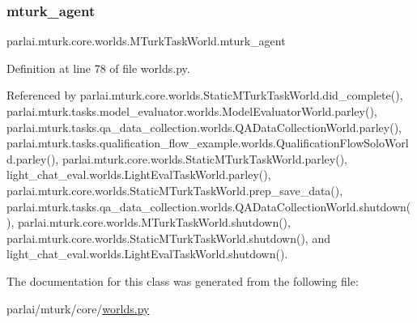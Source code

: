 \subsubsection{\texorpdfstring{mturk\+\_\+agent}{mturk\_agent}}
{\footnotesize\ttfamily parlai.\+mturk.\+core.\+worlds.\+M\+Turk\+Task\+World.\+mturk\+\_\+agent}



Definition at line 78 of file worlds.\+py.



Referenced by parlai.\+mturk.\+core.\+worlds.\+Static\+M\+Turk\+Task\+World.\+did\+\_\+complete(), parlai.\+mturk.\+tasks.\+model\+\_\+evaluator.\+worlds.\+Model\+Evaluator\+World.\+parley(), parlai.\+mturk.\+tasks.\+qa\+\_\+data\+\_\+collection.\+worlds.\+Q\+A\+Data\+Collection\+World.\+parley(), parlai.\+mturk.\+tasks.\+qualification\+\_\+flow\+\_\+example.\+worlds.\+Qualification\+Flow\+Solo\+World.\+parley(), parlai.\+mturk.\+core.\+worlds.\+Static\+M\+Turk\+Task\+World.\+parley(), light\+\_\+chat\+\_\+eval.\+worlds.\+Light\+Eval\+Task\+World.\+parley(), parlai.\+mturk.\+core.\+worlds.\+Static\+M\+Turk\+Task\+World.\+prep\+\_\+save\+\_\+data(), parlai.\+mturk.\+tasks.\+qa\+\_\+data\+\_\+collection.\+worlds.\+Q\+A\+Data\+Collection\+World.\+shutdown(), parlai.\+mturk.\+core.\+worlds.\+M\+Turk\+Task\+World.\+shutdown(), parlai.\+mturk.\+core.\+worlds.\+Static\+M\+Turk\+Task\+World.\+shutdown(), and light\+\_\+chat\+\_\+eval.\+worlds.\+Light\+Eval\+Task\+World.\+shutdown().



The documentation for this class was generated from the following file\+:\begin{DoxyCompactItemize}
\item 
parlai/mturk/core/\hyperlink{parlai_2mturk_2core_2worlds_8py}{worlds.\+py}\end{DoxyCompactItemize}
